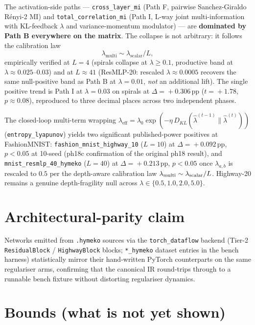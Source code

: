 \documentclass[11pt,a4paper]{article}
\newcommand{\arm}[1]{\texttt{#1}}
\newcommand{\pp}{\,pp}
\begin{document}
The activation-side paths --- \arm{cross_layer_mi} (Path F,
pairwise Sanchez-Giraldo Rényi-2 MI) and \arm{total_correlation_mi}
(Path I, L-way joint multi-information with KL-feedback $\lambda$ and
variance-momentum modulator) --- are \textbf{dominated by Path B
everywhere on the matrix}. The collapse is not arbitrary: it follows
the calibration law
\[
\lambda_{\mathrm{multi}} \sim \lambda_{\mathrm{scalar}} / L,
\]
empirically verified at $L\!=\!4$ (spirals collapse at
$\lambda\!\geq\!0.1$, productive band at
$\lambda\!\approx\!0.025$--$0.03$) and at $L\!\approx\!41$
(ResMLP-20: rescaled $\lambda\!\approx\!0.0005$ recovers the same
null-positive band as Path B at $\lambda\!=\!0.01$, \emph{not} an
additional lift). The single positive trend is Path I at
$\lambda\!=\!0.03$ on spirals at $\Delta\!=\!+0.306$\pp{}
($t\!=\!+1.78$, $p\!\approx\!0.08$), reproduced to three decimal
places across two independent phases.

The closed-loop multi-term wrapping
$\lambda_{\text{eff}}=\lambda_0\exp(-\eta\,D_{KL}(\hat\lambda^{(t-1)}\|\hat\lambda^{(t)}))$
(\arm{entropy_lyapunov}) yields two significant published-power
positives at FashionMNIST: \texttt{fashion\_mnist\_highway\_10}
($L\!=\!10$) at $\Delta\!=\!+0.092$\pp, $p\!<\!0.05$ at 10-seed
(ph18c confirmation of the original ph18 result), and
\texttt{mnist\_resmlp\_40\_hymeko} ($L\!=\!40$) at
$\Delta\!=\!+0.213$\pp, $p\!<\!0.05$ once $\lambda_{a,b}$ is
rescaled to $0.5$ per the depth-aware calibration law
$\lambda_{\rm multi}\sim\lambda_{\rm scalar}/L$. Highway-20
remains a genuine depth-fragility null across
$\lambda\!\in\!\{0.5,1.0,2.0,5.0\}$.

\section*{Architectural-parity claim}

Networks emitted from \texttt{.hymeko} sources via the
\texttt{torch\_dataflow} backend (Tier-2 \texttt{ResidualBlock} /
\texttt{HighwayBlock} blocks; \texttt{*\_hymeko} dataset entries in
the bench harness) statistically mirror their hand-written PyTorch
counterparts on the same regulariser arms, confirming that the
canonical IR round-trips through to a runnable bench fixture
without distorting regulariser dynamics.

\section*{Bounds (what is not yet shown)}
\end{document}
